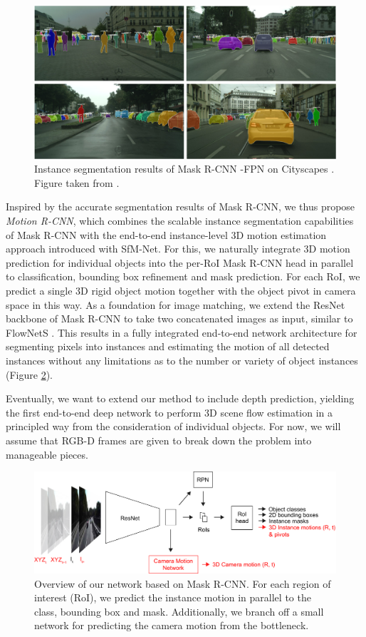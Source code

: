 \begin{figure}[t]
  \centering
  \includegraphics[width=\textwidth]{figures/maskrcnn_cs}
\caption{
Instance segmentation results of Mask R-CNN -FPN \cite{MaskRCNN}
on Cityscapes \cite{Cityscapes}. Figure taken from \cite{MaskRCNN}.
}
\label{figure:maskrcnn_cs}
\end{figure}
Inspired by the accurate segmentation results of Mask R-CNN,
we thus propose \emph{Motion R-CNN}, which combines the scalable instance segmentation capabilities of
Mask R-CNN with the end-to-end instance-level 3D motion estimation approach introduced with SfM-Net.
For this, we naturally integrate 3D motion prediction for individual objects into the per-RoI Mask R-CNN head
in parallel to classification, bounding box refinement and mask prediction.
For each RoI, we predict a single 3D rigid object motion together with the object
pivot in camera space in this way.
As a foundation for image matching, we extend the ResNet \cite{ResNet} backbone of Mask R-CNN to take
two concatenated images as input, similar to FlowNetS \cite{FlowNet}.
This results in a fully integrated end-to-end network architecture for segmenting pixels into instances
and estimating the motion of all detected instances without any limitations
as to the number or variety of object instances (Figure \ref{figure:net_intro}).

Eventually, we want to extend our method to include depth prediction,
yielding the first end-to-end deep network to perform 3D scene flow estimation
in a principled way from the consideration of individual objects.
For now, we will assume that RGB-D frames are given to break down the problem into
manageable pieces.

\begin{figure}[t]
  \centering
  \includegraphics[width=\textwidth]{figures/net_intro}
\caption{
Overview of our network based on Mask R-CNN. For each region of interest (RoI), we predict the instance motion
in parallel to the class, bounding box and mask. Additionally, we branch off a
small network for predicting the camera motion from the bottleneck.
}
\label{figure:net_intro}
\end{figure}

